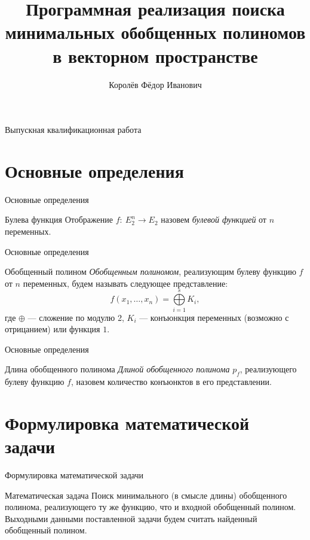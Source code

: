\documentclass{beamer}
\title{Программная реализация поиска минимальных обобщенных полиномов в векторном пространстве}
\author[Королёв~Ф.И.]{Королёв Фёдор Иванович}
\institute[МГУ им. М.В.~Ломоносова]{Московский государственный университет имени М.В.~Ломоносова}
\begin{document}
\begin{frame}{Выпускная квалификационная работа}
\titlepage
\end{frame}

\section[Определения]{Основные определения}
\begin{frame}{Основные определения}

\begin{block}{Булева функция}
Отображение $ f:\ E_2^n \rightarrow E_2 $ назовем \textit{булевой функцией} от $ n $ переменных.
\end{block}

\end{frame}
\begin{frame}{Основные определения}

\begin{block}{Обобщенный полином}
\textit{Обобщенным полиномом}, реализующим булеву функцию $ f $ от $ n $ переменных, будем называть следующее представление:
$$ f(x_1, \dots, x_n) = \bigoplus\limits_{i = 1}^s K_i, $$
где $ \oplus $ --- сложение по модулю 2, $ K_i $ --- конъюнкция переменных (возможно с отрицанием) или функция $ 1 $.
\end{block}

\end{frame}
\begin{frame}{Основные определения}

\begin{block}{Длина обобщенного полинома}
\textit{Длиной обобщенного полинома} $ p_f $, реализующего булеву функцию $ f $, назовем количество конъюнктов в его представлении.
\end{block}

\end{frame}

\section[Математическая задача]{Формулировка математической задачи}
\begin{frame}{Формулировка математической задачи}

\begin{block}{Математическая задача}
Поиск минимального (в смысле длины) обобщенного полинома, реализующего ту же функцию, что и входной обобщенный полином. Выходными данными поставленной задачи будем считать найденный обобщенный полином.
\end{block}

\end{frame}
\end{document}

